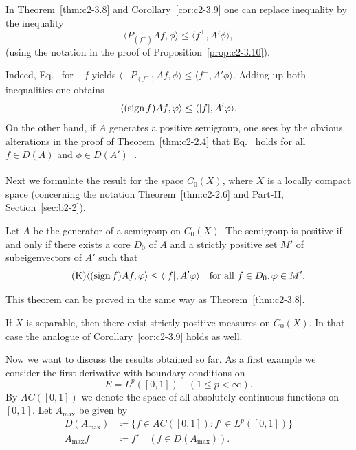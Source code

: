 \begin{remark}\label{rem:c2-3.12}
In Theorem~\ref{thm:c2-3.8} and Corollary~\ref{cor:c2-3.9}  one can replace inequality    by the inequality
\begin{equation}\label{eq:c2-3.6}
\langle P_{(f^{+})}Af,\phi \rangle \leq \langle f^{+},A'\phi \rangle,
\end{equation}
(using the notation in the proof of Proposition~\ref{prop:c2-3.10}).

Indeed, Eq.~ for $-f$ yields $\langle -P_{(f^{-})}Af,\phi \rangle \leq \langle f^{-},A'\phi \rangle$. 
Adding up both inequalities one obtains 
\[
\langle(\sign f)Af,\phi \rangle \leq \langle |f|,A'\phi \rangle .
\]
On the other hand, if\/ $A$ generates a positive semigroup, one sees by
the obvious alterations in the proof of Theorem~\ref{thm:c2-2.4}   that Eq.~ holds for all $f \in D(A)$ and $\phi \in D(A')_{+}$. 

Next we formulate the result for the space $C_{0}(X)$, where $X$ is a locally compact space (concerning the notation \cf Theorem~\ref{thm:c2-2.6} and Part-II, Section~\ref{sec:b2-2}).
\end{remark}
\begin{theorem}\label{thm:c2-3.13}
Let $A$ be the generator of a semigroup on $C_{0}(X)$.
The semigroup is positive if and only if there exists a core $D_{0}$ of
$A$ and a strictly positive set $M'$ of subeigenvectors of\/ $A'$ such
that
\begin{equation}\label{eq:c2-K7} \tag{K}
\langle(\sign f)Af,\phi \rangle \leq \langle |f|,A'\phi \rangle \quad \text{for all } f \in D_{0}, \phi \in M'.
\end{equation}
\end{theorem}
This theorem can be proved in the same way as Theorem~\ref{thm:c2-3.8}.
\begin{remark*}
If\/ $X$ is separable, then there exist strictly positive
measures on $C_{0}(X)$. 
In that case the analogue of Corollary~\ref{cor:c2-3.9}   holds
as well.
\end{remark*}
Now we want to discuss the results obtained so far.
As a first example we consider the first derivative with boundary
conditions on %
\[
	E = L^{p}([0,1]) \quad (1 \leq p < \infty).
\]
%
By $AC([0,1])$ we denote the space of all absolutely continuous functions on $[0,1]$. 
Let $A_{\max}$ be given by
\begin{align*}
D(A_{\max}) &\coloneq \{f \in AC([0,1]) \colon f' \in L^{p}([0,1])\}\\
A_{\max}f &\coloneq f' \quad (f \in D(A_{\max})).
\end{align*}
